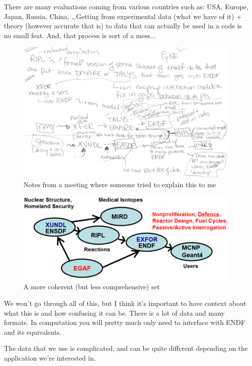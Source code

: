 \documentclass[12pt]{article}
\begin{document}
There are many evaluations coming from various countries such as: USA, Europe, Japan, Russia, China, \dots Getting from experimental data (what we have of it) + theory (however accurate that is) to data that can actually be used in a code is no small feat. And, that process is sort of a mess...
\begin{figure}[h!]
    \begin{center}
    \includegraphics[keepaspectratio, width = 6 in]{data-notes}
    \end{center}
    \caption{Notes from a meeting where someone tried to explain this to me}
    \label{fig:datanotes}
\end{figure}
\begin{figure}[h!]
    \begin{center}
    \includegraphics[keepaspectratio, width = 4.5 in]{hurst-code-map}
    \end{center}
    \caption{A more coherent (but less comprehensive) set}
    \label{fig:hurstfig}
\end{figure}

We won't go through all of this, but I think it's important to have context about what this is and how confusing it can be. There is a lot of data and many formats. In computation you will pretty much only need to interface with ENDF and its equivalents. 

The data that we use is complicated, and can be quite different depending on the application we're interested in.
\end{document}
